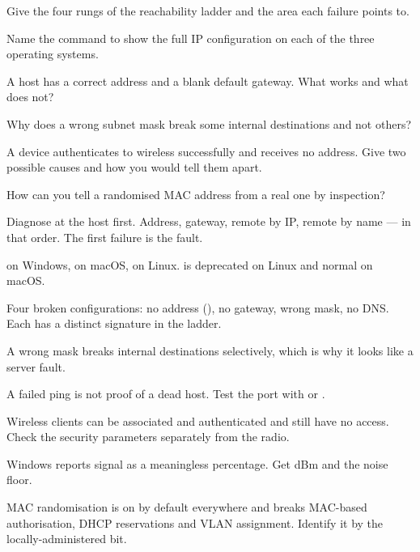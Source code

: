 \begin{checkpoint}
\begin{tightnum}
  \item Give the four rungs of the reachability ladder and the area each failure
        points to.
  \item Name the command to show the full IP configuration on each of the three
        operating systems.
  \item A host has a correct address and a blank default gateway. What works and
        what does not?
  \item Why does a wrong subnet mask break some internal destinations and not
        others?
  \item A device authenticates to wireless successfully and receives no address.
        Give two possible causes and how you would tell them apart.
  \item How can you tell a randomised MAC address from a real one by inspection?
\end{tightnum}
\end{checkpoint}

\begin{chaptersummary}
\begin{tight}
  \item Diagnose at the host first. Address, gateway, remote by IP, remote by
        name --- in that order. The first failure is the fault.
  \item {} on Windows,  on macOS,  on
        Linux.  is deprecated on Linux and normal on macOS.
  \item Four broken configurations: no address (), no gateway, wrong
        mask, no DNS. Each has a distinct signature in the ladder.
  \item A wrong mask breaks internal destinations selectively, which is why it
        looks like a server fault.
  \item A failed ping is not proof of a dead host. Test the port with
         or .
  \item Wireless clients can be associated and authenticated and still have no
        access. Check the security parameters separately from the radio.
  \item Windows reports signal as a meaningless percentage. Get dBm and the noise
        floor.
  \item MAC randomisation is on by default everywhere and breaks MAC-based
        authorisation, DHCP reservations and VLAN assignment. Identify it by the
        locally-administered bit.
\end{tight}
\end{chaptersummary}

